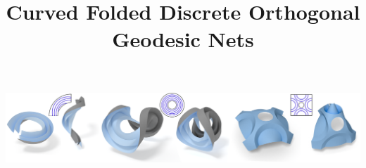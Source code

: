 \documentclass[acmtog,anonymous,review]{acmart}
\begin{document}
\title{Curved Folded Discrete Orthogonal Geodesic Nets}


\begin{teaserfigure}
  \centering
  \includegraphics[width=\linewidth]{figures/teaser}
  \caption{\label{fig:teaser} 
}
\end{teaserfigure}
\begin{abstract}

\end{abstract}
\end{document}
